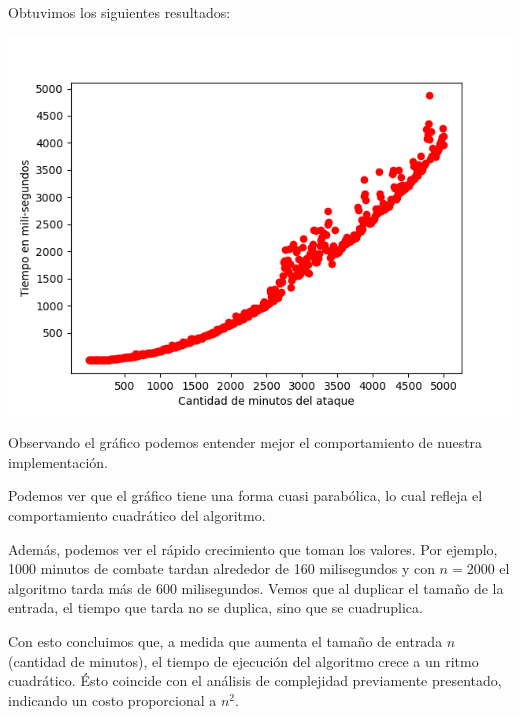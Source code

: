 \documentclass{article}
\begin{document}
Obtuvimos los siguientes resultados:

\includegraphics[scale=0.69]{graficoComplejidad.png}

Observando el gráfico podemos entender mejor el comportamiento de nuestra implementación. 

Podemos ver que el gráfico tiene una forma cuasi parabólica, lo cual refleja el comportamiento cuadrático del algoritmo.

Además, podemos ver el rápido crecimiento que toman los valores. Por ejemplo, 1000 minutos de combate tardan alrededor de 160 milisegundos y con $n = 2000$ el algoritmo tarda más de 600 milisegundos. Vemos que al duplicar el tamaño de la entrada, el tiempo que tarda no se duplica, sino que se cuadruplica.

Con esto concluimos que, a medida que aumenta el tamaño de entrada $n$ (cantidad de minutos), el tiempo de ejecución del algoritmo crece a un ritmo cuadrático. Ésto coincide con el análisis de complejidad previamente presentado, indicando un costo proporcional a $n^2$.
\end{document}
